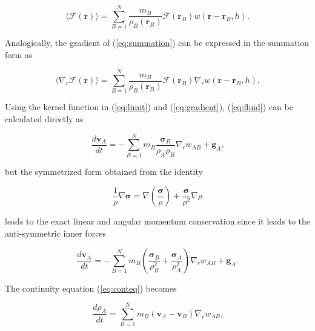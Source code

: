 \documentclass{svproc}
\newcommand{\reva}[1]{{\color{black}#1}}
\begin{document}
\begin{equation}
\label{eq:summation}
\langle\mathcal{F}\left({\bm r}\right)\rangle=\sum\limits_{B=1}^{N}\frac{m_B}{\rho_B\left({\bm r}_B\right)}\mathcal{F}\left({\bm r}_B\right)w\left({\bm r} - {\bm r}_B, h\right)
\mbox{.}
\end{equation}

Analogically, the gradient of (\ref{eq:summation})  can be expressed in the summation form as

\begin{equation}
\label{eq:gradient}
\langle\nabla_r\mathcal{F}\left({\bm r}\right)\rangle=\sum\limits_{B=1}^{N}\frac{m_B}{\rho_B\left({\bm r}_B\right)}\mathcal{F}\left({\bm r}_B\right)\nabla_r w\left({\bm r} - {\bm r}_B, h\right)
\mbox{.}
\end{equation}

Using the kernel function in (\ref{eq:limit}) and (\ref{eq:gradient}), (\ref{eq:fluid}) can be calculated directly as

\begin{equation}
\frac{d{\bm v}_A}{dt}=-\sum\limits_{B=1}^{N}m_B\frac{\bm\sigma_B}{\rho_A \rho_B}\nabla_r w_{AB}+{\bm g}_A
\mbox{,}
\end{equation}

\noindent
\reva{but the symmetrized form obtained from the identity

\begin{equation}
\frac{1}{\rho}\nabla\bm\sigma=\nabla\left(\frac{\bm\sigma}{\rho}\right)+\frac{\bm\sigma}{\rho^2}\nabla\rho
\end{equation}

\noindent
leads to the exact linear and angular momentum conservation since it leads to the anti-symmetric inner forces}

\begin{equation}
\label{eq:motion}
\frac{d{\bm v}_A}{dt}=-\sum\limits_{B=1}^{N}m_B\left(\frac{\bm\sigma_B}{\rho_B^2}+\frac{\bm\sigma_A}{\rho_A^2}\right)\nabla_r w_{AB}+{\bm g}_A
\mbox{.}
\end{equation}

The continuity equation (\ref{eq:conteq}) becomes

\begin{equation}
\label{eq:continuity}
\frac{d\rho_A}{dt}=\sum\limits_{B=1}^{N}m_B\left({\bm v}_A-{\bm v}_B\right)\nabla_r w_{AB}
\mbox{,}
\end{equation}
\end{document}
